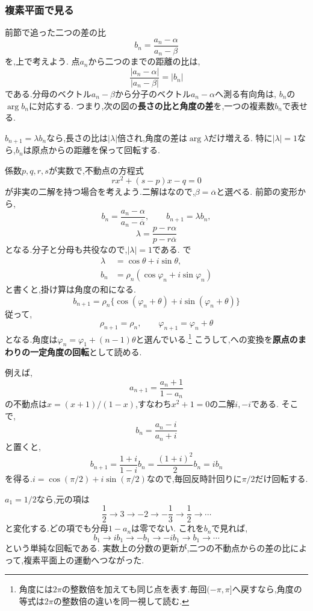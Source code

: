 
\subsubsection{複素平面で見る}

  前節で追った二つの差の比
  \[
    b_n=\frac{a_n-\alpha}{a_n-\beta}
  \]
  を,上で考えよう.
  点$a_n$から二つのまでの距離の比は,
  \[
    \frac{|a_n-\alpha|}{|a_n-\beta|}=|b_n|
  \]
  である.分母のベクトル$a_n-\beta$から分子のベクトル$a_n-\alpha$へ測る有向角は,
  $b_n$の$\arg b_n$に対応する.
  つまり,次の図の\textbf{長さの比と角度の差}を,一つの複素数$b_n$で表せる.
  \BookFigMobius

  $b_{n+1}=\lambda b_n$なら,長さの比は$|\lambda|$倍され,角度の差は$\arg\lambda$だけ増える.
  特に$|\lambda|=1$なら,$b_n$は原点からの距離を保って回転する.

  係数$p,q,r,s$が実数で,不動点の方程式
  \[
    rx^2+(s-p)x-q=0
  \]
  が非実の二解を持つ場合を考えよう.二解はなので,$\beta=\overline\alpha$と選べる.
  前節の変形から,
  \[
    b_n=\frac{a_n-\alpha}{a_n-\overline\alpha},\qquad
    b_{n+1}=\lambda b_n,
  \]
  \[
    \lambda=\frac{p-r\alpha}{p-r\overline\alpha}
  \]
  となる.分子と分母も共役なので,$|\lambda|=1$である.
  で
  \begin{align*}
    \lambda&=\cos\theta+i\sin\theta,\\
    b_n&=\rho_n(\cos\varphi_n+i\sin\varphi_n)
  \end{align*}
  と書くと,掛け算は角度の和になる.
  \[
    b_{n+1}=\rho_n\{\cos(\varphi_n+\theta)
      +i\sin(\varphi_n+\theta)\}
  \]
  従って,
  \[
    \rho_{n+1}=\rho_n,\qquad
    \varphi_{n+1}=\varphi_n+\theta
  \]
  となる.角度は$\varphi_n=\varphi_1+(n-1)\theta$と選んでいる.\footnote{角度には$2\pi$の整数倍を加えても同じ点を表す.毎回$(-\pi,\pi]$へ戻すなら,角度の等式は$2\pi$の整数倍の違いを同一視して読む.}
  こうして,への変換を\textbf{原点のまわりの一定角度の回転}として読める.

  例えば,
  \[
    a_{n+1}=\frac{a_n+1}{1-a_n}
  \]
  の不動点は$x=(x+1)/(1-x)$,すなわち$x^2+1=0$の二解$i,-i$である.
  そこで,
  \[
    b_n=\frac{a_n-i}{a_n+i}
  \]
  と置くと,
  \[
    b_{n+1}=\frac{1+i}{1-i}b_n
      =\frac{(1+i)^2}{2}b_n=ib_n
  \]
  を得る.$i=\cos(\pi/2)+i\sin(\pi/2)$なので,毎回反時計回りに$\pi/2$だけ回転する.

  $a_1=1/2$なら,元の項は
  \[
    \frac12\longrightarrow3\longrightarrow-2
    \longrightarrow-\frac13\longrightarrow\frac12\longrightarrow\cdots
  \]
  と変化する.どの項でも分母$1-a_n$は零でない.
  これを$b_n$で見れば,
  \[
    b_1\longrightarrow ib_1\longrightarrow-b_1
    \longrightarrow-ib_1\longrightarrow b_1\longrightarrow\cdots
  \]
  という単純な回転である.
  実数上の分数の更新が,二つの不動点からの差の比によって,複素平面上の運動へつながった.
